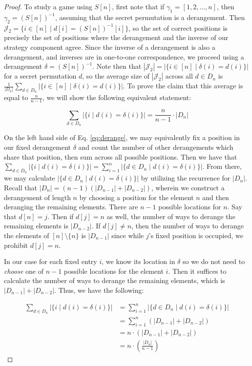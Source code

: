 \documentclass[10pt,a4paper]{amsart}
\begin{document}
\begin{proof}
To study a game using $S[n]$, first note that if $\gamma_1 = [1,2,\dots,n]$, then $\gamma_2 = (S[n])^{-1}$, assuming that the secret permutation is a derangement. Then $\mathcal{J}_2 = \{i \in [n] \mid d[i] = (S[n])^{-1}[i] \} $, so the set of correct positions is precisely the set of positions where the derangement and the inverse of our strategy component agree. Since the inverse of a derangement is also a derangement, and inverses are in one-to-one correspondence, we proceed using a derangement $\delta = (S[n])^{-1}$. Note then that $|\mathcal{J}_2| = \left| \{ i \in [n] \mid \delta(i) = d(i) \} \right|$ for a secret permutation $d$, so the average size of $|\mathcal{J}_2|$ across all $d \in D_n$ is $\frac{1}{|D_n|} \sum_{d \in D_n} \left| \{ i \in [n] \mid \delta(i) = d(i) \} \right|$. To prove the claim that this average is equal to $\frac{n}{n-1}$, we will show the following equivalent statement:

\begin{equation} \label{eq:derange}
    \sum_{d \in D_n} \left| \{ i \mid d(i) = \delta (i) \} \right| = \frac{n}{n-1} \cdot | D_n|
\end{equation}

\vspace{0.25cm}

On the left hand side of Eq. \ref{eq:derange}, we may equivalently fix a position in our fixed derangement $\delta$ and count the number of other derangements which share that position, then sum across all possible positions. Then we have that 
$ \sum_{d \in D_n} \left| \{ i \mid d(i) = \delta(i) \} \right| 
= \sum_{i=1}^n \left| \{ d \in D_n \mid d(i) = \delta(i) \} \right| $. From there, we may calculate $| \{ d \in D_n \mid d(i) = \delta(i) \} |$ by utilizing the recurrence for $|D_n|$. Recall that $|D_n| = (n-1)(|D_{n-1}| + |D_{n-2}|)$, wherein we construct a derangement of length $n$ by choosing a position for the element $n$ and then deranging the remaining elements. There are $n-1$ possible locations for $n$. Say that $d[n] = j$. Then if $d[j] = n$ as well, the number of ways to derange the remaining elements is $|D_{n-2}|$. If $d[j] \neq n$, then the number of ways to derange the elements of $[n] \setminus \{n\}$ is $|D_{n-1}|$ since while $j$'s fixed position is occupied, we prohibit $d[j] = n$.

In our case for each fixed entry $i$, we know its location in $\delta$ so we do not need to \textit{choose} one of $n-1$ possible locations for the element $i$. Then it suffices to calculate the number of ways to derange the remaining elements, which is $|D_{n-1}| + |D_{n-2}|$. Thus, we have the following:

\begin{align*}
    \sum_{d \in D_n} \left| \{ i \mid d(i) = \delta(i) \} \right|
    &= \sum_{i=1}^n \left| \{ d \in D_n \mid d(i) = \delta(i) \} \right| \\
    &= \sum_{i=1}^n (|D_{n-1}| + |D_{n-2}|) \\ 
    &= n \cdot (|D_{n-1}| + |D_{n-2}|) \\ 
    &= n \cdot \left( \frac{|D_n|}{n-1} \right) 
\end{align*}
    
\end{proof}
\end{document}
